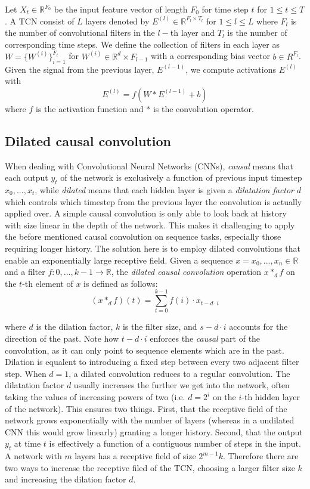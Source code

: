 Let $X_t \in \mathbb{R}^{F_0}$ be the input feature vector of length $F_0$ for time step $t$ for $1 \leq t \leq T$. A TCN consist of $L$ layers denoted by $E^{(l)} \in \mathbb{R}^{F_l \times T_l}$ for $1 \leq l \leq L$ where $F_l$ is the number of convolutional filters in the $l-$th layer and $T_l$ is the number of corresponding time steps.
We define the collection of filters in each layer as $W=\{W^{(i)}\}^{F_l}_{i=1}$ for $W^{(i)} \in \mathbb{R}^d \times F_{l-1}$ with a corresponding bias vector $b \in R^{F_l}$. Given the signal from the previous layer, $E^{(l-1)}$, we compute activations $E^{(l)}$ with
$$ E^{(l)} = f(W * E^{(l-1)}+b) $$
where $f$ is the activation function and $*$ is the convolution operator. 

\subsection{Dilated causal convolution}

When dealing with Convolutional Neural Networks (CNNs), \textit{causal} means that each output $y_t$ of the network is exclusively a function of previous input timestep $x_0, ..., x_t$, while \textit{dilated} means that each hidden layer is given a \textit{dilatation factor} $d$ which controls which timestep from the previous layer the convolution is actually applied over. 
A simple causal convolution is only able to look back at history with size linear in the depth of the network. This makes it challenging to apply the before mentioned causal convolution on sequence tasks, especially those requiring longer history. The solution here is to employ dilated convolutions that enable an exponentially large receptive field. 
Given a sequence $x=x_0, ..., x_n \in \mathbb{R}$ and a filter $f: 0, ..., k-1 \rightarrow \mathbb{R}$, the \textit{dilated causal convolution} operation $x*_d f$ on the $t$-th element of $x$ is defined as follows:
$$(x*_d f)(t)=\sum\limits_{t=0}^{k-1} f(i) \cdot x_{t-d \cdot i} $$

where $d$ is the dilation factor, $k$ is the filter size, and $s-d \cdot i$ accounts for the direction of the past.
Note how $t-d \cdot i$ enforces the \textit{causal} part of the convolution, as it can only point to sequence elements which are in the past. Dilation is equalent to introducing a fixed step between every two adjacent filter step. When $d=1$, a dilated convolution reduces to a regular convolution. The dilatation factor $d$ usually increases the further we get into the network, often taking the values of increasing powers of two (i.e. $d=2^i$ on the $i$-th hidden layer of the network). This ensures two things. First, that the receptive field of the network grows exponentially with the number of layers (whereas in a undilated CNN this would grow linearly) granting a longer history. Second, that the output $y_t$ at time $t$ is effectively a function of a contiguous number of steps in the input. A network with $m$ layers has a receptive field of size $2^{m-1}k$. Therefore there are two ways to increase the receptive filed of the TCN, choosing a larger filter size $k$ and increasing the dilation factor $d$.


